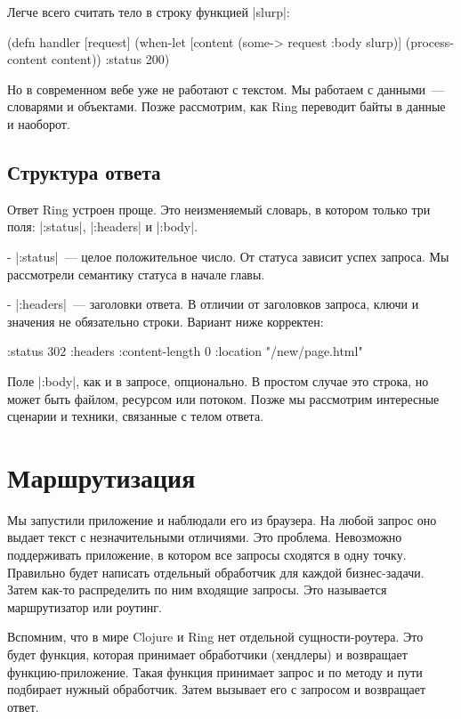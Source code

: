 Легче всего считать тело в строку функцией \spverb|slurp|:

\begin{code}
(defn handler
  [request]
  (when-let [content
             (some-> request :body slurp)]
    (process-content content))
  {:status 200})
\end{code}

Но в современном вебе уже не работают с текстом. Мы работаем с данными~---
словарями и объектами. Позже рассмотрим, как Ring переводит байты в данные и
наоборот.

\subsection{Структура ответа}

Ответ Ring устроен проще. Это неизменяемый словарь, в котором только три поля:
\spverb|:status|, \spverb|:headers| и \spverb|:body|.

- \spverb|:status|~--- целое положительное число. От статуса зависит успех запроса. Мы
  рассмотрели семантику статуса в начале главы.

- \spverb|:headers|~--- заголовки ответа. В отличии от заголовков запроса, ключи и
  значения не обязательно строки. Вариант ниже корректен:

\begin{code}
{:status 302
 :headers {:content-length 0
           :location "/new/page.html"}}
\end{code}

Поле \spverb|:body|, как и в запросе, опционально. В простом случае это строка, но
может быть файлом, ресурсом или потоком. Позже мы рассмотрим интересные сценарии
и техники, связанные с телом ответа.

\section{Маршрутизация}

Мы запустили приложение и наблюдали его из браузера. На любой запрос оно выдает
текст с незначительными отличиями. Это проблема. Невозможно поддерживать
приложение, в котором все запросы сходятся в одну точку. Правильно будет
написать отдельный обработчик для каждой бизнес-задачи. Затем как-то
распределить по ним входящие запросы. Это называется маршрутизатор или роутинг.

Вспомним, что в мире Clojure и Ring нет отдельной сущности-роутера. Это будет
функция, которая принимает обработчики (хендлеры) и возвращает
функцию-приложение. Такая функция принимает запрос и по методу и пути подбирает
нужный обработчик. Затем вызывает его с запросом и возвращает ответ.

